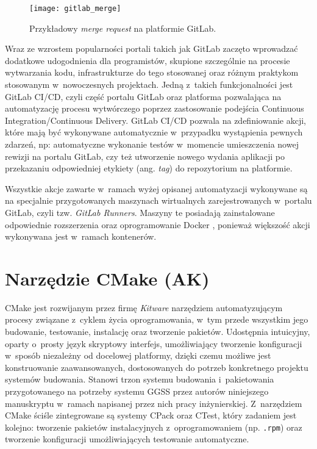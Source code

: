 \begin{figure}[H]
    \centering
    \texttt{[image: gitlab\_merge]}
    \caption{Przykładowy \emph{merge request} na platformie GitLab.}
    \label{fig:merge}
\end{figure}

Wraz ze wzrostem popularności portali takich jak GitLab zaczęto wprowadzać dodatkowe udogodnienia dla programistów, skupione szczególnie na procesie wytwarzania kodu, infrastrukturze do tego stosowanej oraz różnym praktykom stosowanym w~nowoczesnych projektach. Jedną z~takich funkcjonalności jest GitLab CI/CD, czyli część portalu GitLab oraz platforma pozwalająca na automatyzację procesu wytwórczego poprzez zastosowanie podejścia Continuous Integration/Continuous Delivery. GitLab CI/CD pozwala na zdefiniowanie akcji, które mają być wykonywane automatycznie w~przypadku wystąpienia pewnych zdarzeń, np: automatyczne wykonanie testów w~momencie umieszczenia nowej rewizji na portalu GitLab, czy też utworzenie nowego wydania aplikacji po przekazaniu odpowiedniej etykiety (ang. \emph{tag}) do repozytorium na platformie.

Wszystkie akcje zawarte w~ramach wyżej opisanej automatyzacji wykonywane są na specjalnie przygotowanych maszynach wirtualnych zarejestrowanych w~portalu GitLab, czyli tzw. \emph{GitLab Runners}. Maszyny te posiadają zainstalowane odpowiednie rozszerzenia oraz oprogramowanie Docker \cite{docker_main}, ponieważ większość akcji wykonywana jest w~ramach kontenerów.


\section{Narzędzie CMake (AK)}
CMake jest rozwijanym przez firmę \emph{Kitware} narzędziem automatyzującym procesy związane z~cyklem życia oprogramowania, w~tym przede wszystkim jego budowanie, testowanie, instalację oraz tworzenie pakietów. Udostępnia intuicyjny, oparty o~prosty język skryptowy interfejs, umożliwiający tworzenie konfiguracji w~sposób niezależny od docelowej platformy, dzięki czemu możliwe jest konstruowanie zaawansowanych, dostosowanych do potrzeb konkretnego projektu systemów budowania. Stanowi trzon systemu budowania i~pakietowania przygotowanego na potrzeby systemu GGSS przez autorów niniejszego manuskryptu w~ramach napisanej przez nich pracy inżynierskiej. Z~narzędziem CMake ściśle zintegrowane są systemy CPack oraz CTest, który zadaniem jest kolejno: tworzenie pakietów instalacyjnych z~oprogramowaniem (np. \lstinline{.rpm}) oraz tworzenie konfiguracji umożliwiających testowanie automatyczne.

